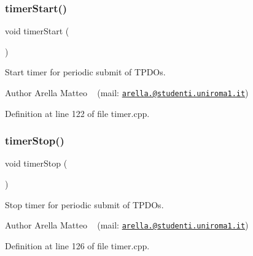 \subsubsection{\texorpdfstring{timer\+Start()}{timerStart()}}
{\footnotesize\ttfamily void timer\+Start (\begin{DoxyParamCaption}{ }\end{DoxyParamCaption})}



Start timer for periodic submit of T\+P\+D\+Os. 

\begin{DoxyAuthor}{Author}
Arella Matteo ~\newline
 (mail\+: \href{mailto:arella.1646983@studenti.uniroma1.it}{\tt arella.@studenti.\+uniroma1.\+it}) 
\end{DoxyAuthor}


Definition at line 122 of file timer.\+cpp.

\mbox{\label{group___c_a_nopen__timer__module_gaecc39b6c4a6a4d79a46ac2b6371221c5}} 
\subsubsection{\texorpdfstring{timer\+Stop()}{timerStop()}}
{\footnotesize\ttfamily void timer\+Stop (\begin{DoxyParamCaption}{ }\end{DoxyParamCaption})}



Stop timer for periodic submit of T\+P\+D\+Os. 

\begin{DoxyAuthor}{Author}
Arella Matteo ~\newline
 (mail\+: \href{mailto:arella.1646983@studenti.uniroma1.it}{\tt arella.@studenti.\+uniroma1.\+it}) 
\end{DoxyAuthor}


Definition at line 126 of file timer.\+cpp.

